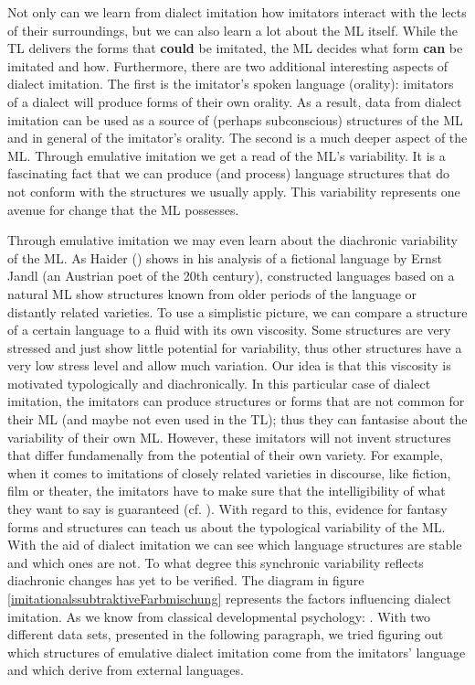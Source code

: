 \documentclass[output=paper]{LSP/langsci}
\begin{document}
Not only can we learn from dialect imitation how imitators interact with the lects of their surroundings, but we can also learn a lot about the ML itself. While the TL delivers the forms that \textbf{could} be imitated, the ML decides what form \textbf{can} be imitated and how.  Furthermore, there are two additional interesting aspects of dialect imitation. The first is the imitator’s spoken language (orality): imitators of a dialect will produce forms of their own orality. As a result, data from dialect imitation can be used as a source of (perhaps subconscious) structures of the ML and in general of the imitator’s orality. The second is a much deeper aspect of the ML. Through emulative imitation we get a read of the ML’s variability. It is a fascinating fact that we can produce (and process) language structures that do not conform with the structures we usually  apply. This variability represents one avenue for change that the ML possesses. 

Through emulative imitation we may even learn about the diachronic variability of the ML. As Haider (\citeyear[135]{haider_poetenpidgin_2007}) shows in his analysis of a fictional language by Ernst Jandl (an Austrian poet of the 20th century), constructed languages based on a natural ML show structures known from older periods of the language or distantly related varieties. To use a simplistic picture, we can compare a structure of a certain language to a fluid with its own viscosity. Some structures are very stressed and just show little potential for variability, thus other structures have a very low stress level and allow much variation. Our idea is that this viscosity is motivated typologically and diachronically. In this particular case of dialect imitation, the imitators can produce structures or forms that are not common for their ML (and maybe not even used in the TL); thus they can fantasise about the variability of their own ML. However, these imitators will not invent structures that differ fundamenally from the potential of their own variety. For example, when it comes to imitations of closely related varieties in discourse, like fiction, film or theater, the imitators have to make sure that the intelligibility of what they want to say is guaranteed (cf. \citeyear{SchaeferDiss}). With regard to this, evidence for fantasy forms and structures can teach us about the typological variability of the ML. With the aid of dialect imitation we can see which language structures are stable and which ones are not. To what degree this synchronic variability reflects diachronic changes has yet to be verified. The diagram in figure \ref{imitationalssubtraktiveFarbmischung} represents the factors influencing dialect imitation. As we know from classical developmental psychology:  \citep[2]{uzgiris_two_1981}. With two different data sets, presented in the following paragraph, we tried figuring out which structures of emulative dialect imitation come from the imitators' language and which derive from external languages.
\end{document}
